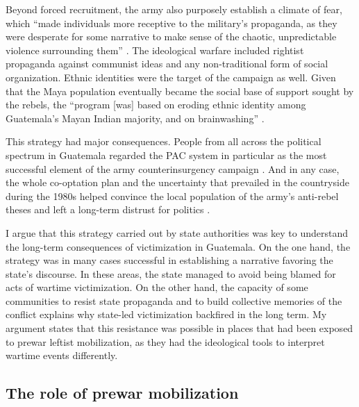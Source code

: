 \documentclass[12pt, notitlepage]{article}
\begin{document}
Beyond forced recruitment, the army also purposely establish a climate of fear, which ``made individuals more receptive to the military's propaganda, as they were desperate for some narrative to make sense of the chaotic, unpredictable violence surrounding them'' \citep[643]{Bateson:2017aa}.
The ideological warfare included rightist propaganda against communist ideas and any non-traditional form of social organization.
Ethnic identities were the target of the campaign as well.
Given that the Maya population eventually became the social base of support sought by the rebels, the ``program [was] based on eroding ethnic identity among Guatemala's Mayan Indian majority, and on brainwashing'' \citep[21]{Black:1985aa}.

This strategy had major consequences.
People from all across the political spectrum in Guatemala regarded the PAC system in particular as the most successful element of the army counterinsurgency campaign \citep{Garrard-Burnett:2010aa}.
And in any case, the whole co-optation plan and the uncertainty that prevailed in the countryside during the 1980s helped convince the local population of the army's anti-rebel theses and left a long-term distrust for politics \citep{Green:1995aa}.

I argue that this strategy carried out by state authorities was key to understand the long-term consequences of victimization in Guatemala.
On the one hand, the strategy was in many cases successful in establishing a narrative favoring the state's discourse.
In these areas, the state managed to avoid being blamed for acts of wartime victimization.
On the other hand, the capacity of some communities to resist state propaganda and to build collective memories of the conflict explains why state-led victimization backfired in the long term.
My argument states that this resistance was possible in places that had been exposed to prewar leftist mobilization, as they had the ideological tools to interpret wartime events differently.


\subsection*{The role of prewar mobilization}
\end{document}
